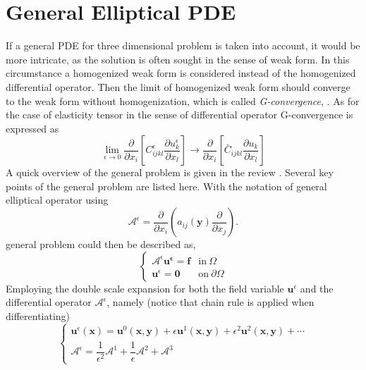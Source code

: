 \documentclass[10pt,a4paper]{scrreprt}
\begin{document}
\section{General Elliptical PDE}
If a general PDE for three dimensional problem is taken into account, it would be more intricate, as the solution is often sought in the sense of weak form. In this circumstance a homogenized weak form is considered instead of the homogenized differential operator. Then the limit of homogenized weak form should converge to the weak form without homogenization, which is called \textit{G-convergence}, \citep{hollister1992comparison}. As for the case of elasticity tensor in the sense of differential operator G-convergence is expressed as
\begin{equation}
\label{eq: G conv}
\lim_{\epsilon \to 0} \dfrac{\partial}{\partial x_{i}} \left[ C^{\epsilon}_{ijkl} \dfrac{\partial u^{\epsilon}_{k}}{\partial x_{l}} \right] \rightarrow \dfrac{\partial}{\partial x_{i}} \left[ \bar{C}_{ijkl} \dfrac{\partial u_{k}}{\partial x_{l}} \right]
\end{equation}
A quick overview of the general problem is given in the review \citep{hassani1998review}. Several key points of the general problem are listed here. With the notation of general elliptical operator using 
\begin{equation}
\mathcal{A}^{\epsilon} = \dfrac{\partial}{\partial x_{i}} \left( a_{ij}(\mathbf{y}) \dfrac{\partial}{\partial x_{j}} \right).
\end{equation}
general problem could then be described as,
\begin{equation}
\left\{
\begin{array}{ll}
\mathcal{A}^{\epsilon} \mathbf{u^{\epsilon}}= \mathbf{f} & \text{in} \ \Omega \\
\mathbf{u}^{\epsilon} = \mathbf{0} & \text{on} \ \partial \Omega
\end{array}
\right.
\end{equation}
Employing the double scale expansion for both the field variable $\mathbf{u}^{\epsilon}$ and the differential operator $\mathcal{A}^{\epsilon}$, namely (notice that chain rule is applied when differentiating)
\begin{equation}
\left\{
\begin{array}{l}
\mathbf{u}^{\epsilon}(\mathbf{x}) = \mathbf{u}^{0}(\mathbf{x},\mathbf{y}) + \epsilon \mathbf{u}^{1}(\mathbf{x},\mathbf{y}) + \epsilon^{2} \mathbf{u}^{2}(\mathbf{x},\mathbf{y}) + \cdots \\
\mathcal{A}^{\epsilon} = \dfrac{1}{\epsilon^{2}} \mathcal{A}^{1} + \dfrac{1}{\epsilon} \mathcal{A}^{2} + \mathcal{A}^{3}
\end{array}
\right.
\end{equation}
\end{document}
